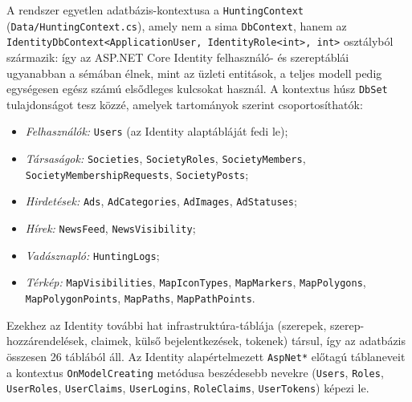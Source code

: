A rendszer egyetlen adatbázis-kontextusa a \texttt{HuntingContext}
(\texttt{Data/HuntingContext.cs}), amely nem a sima \texttt{DbContext}, hanem az
\texttt{IdentityDbContext<ApplicationUser, IdentityRole<int>, int>} osztályból származik: így az
ASP.NET Core Identity felhasználó- és szereptáblái ugyanabban a sémában élnek, mint az üzleti
entitások, a teljes modell pedig egységesen egész számú elsődleges kulcsokat használ. A kontextus
húsz \texttt{DbSet} tulajdonságot tesz közzé, amelyek tartományok szerint csoportosíthatók:

\begin{itemize}[nosep]
	\item \emph{Felhasználók:} \texttt{Users} (az Identity alaptábláját fedi le);
	\item \emph{Társaságok:} \texttt{Societies}, \texttt{SocietyRoles}, \texttt{SocietyMembers},
	      \texttt{SocietyMembershipRequests}, \texttt{SocietyPosts};
	\item \emph{Hirdetések:} \texttt{Ads}, \texttt{AdCategories}, \texttt{AdImages},
	      \texttt{AdStatuses};
	\item \emph{Hírek:} \texttt{NewsFeed}, \texttt{NewsVisibility};
	\item \emph{Vadásznapló:} \texttt{HuntingLogs};
	\item \emph{Térkép:} \texttt{MapVisibilities}, \texttt{MapIconTypes}, \texttt{MapMarkers},
	      \texttt{MapPolygons}, \texttt{MapPolygonPoints}, \texttt{MapPaths},
	      \texttt{MapPathPoints}.
\end{itemize}

Ezekhez az Identity további hat infrastruktúra-táblája (szerepek, szerep-hozzárendelések,
claimek, külső bejelentkezések, tokenek) társul, így az adatbázis összesen 26 táblából áll. Az
Identity alapértelmezett \texttt{AspNet*} előtagú táblaneveit a kontextus
\texttt{OnModelCreating} metódusa beszédesebb nevekre (\texttt{Users}, \texttt{Roles},
\texttt{UserRoles}, \texttt{UserClaims}, \texttt{UserLogins}, \texttt{RoleClaims},
\texttt{UserTokens}) képezi le.

